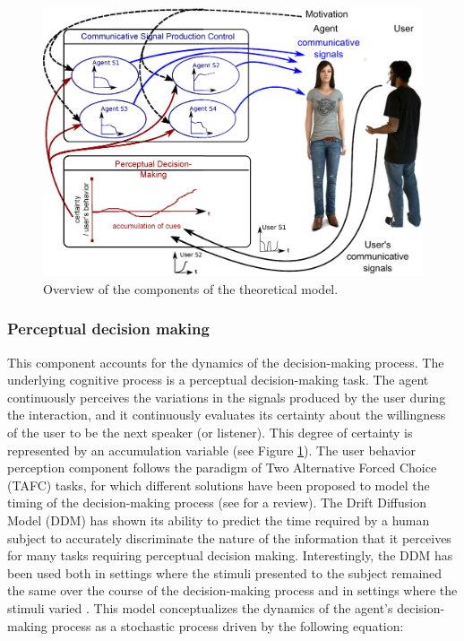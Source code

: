 \documentclass[twocolumn]{svjour3}
\begin{document}
\begin{figure}
  \includegraphics[width=\linewidth]{figure/modele_conceptuel_act.eps}
  \caption{Overview of the components of the theoretical model.}
  \label{fig:mod-comp}
\end{figure}

\subsubsection{Perceptual decision making}

This component accounts for the dynamics of the decision-making process. The underlying cognitive process is a perceptual decision-making task. The agent continuously perceives the variations in the signals produced by the user during the interaction, and it continuously evaluates its certainty about the willingness of the user to be the next speaker (or listener). This degree of certainty is represented by an accumulation variable (see Figure \ref{fig:mod-comp}).
The user behavior perception component follows the paradigm of Two Alternative Forced Choice (TAFC) tasks, for which different solutions have been proposed to model the timing of the decision-making process (see \citep{bogacz_physics_2006} for a review). 
The Drift Diffusion Model (DDM) has shown its ability to predict the time required by a human subject to accurately discriminate the nature of the information that it perceives for many tasks requiring perceptual decision making. 
Interestingly, the DDM has been used both in settings where the stimuli presented to the subject remained the same over the course of the decision-making process and in settings where the stimuli varied \cite{ratcliff_note_1980}. This model conceptualizes the dynamics of the agent's decision-making process as a stochastic process driven by the following equation:
\end{document}
